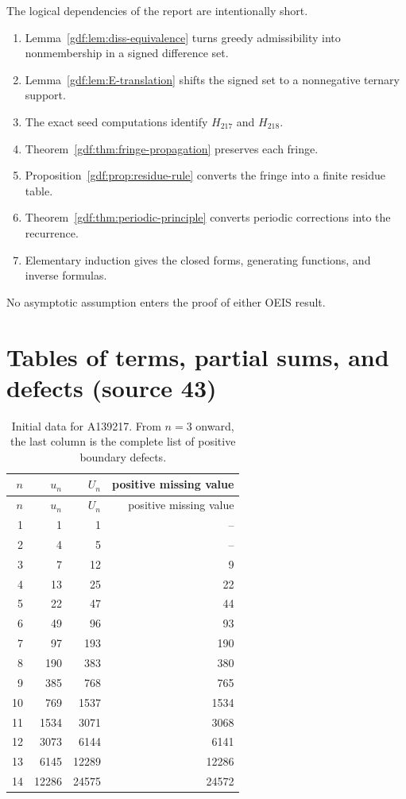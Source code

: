 \documentclass[11pt,a4paper]{article}
\numberwithin{equation}{section}
\theoremstyle{definition}
\theoremstyle{remark}
\theoremstyle{plain}
\newcommand{\src}[1]{\textup{(source #1)}}
\begin{document}
The logical dependencies of the report are intentionally short.
\begin{enumerate}[label=(\arabic*)]
\item Lemma~\ref{gdf:lem:diss-equivalence} turns greedy admissibility into
      nonmembership in a signed difference set.
\item Lemma~\ref{gdf:lem:E-translation} shifts the signed set to a nonnegative
      ternary support.
\item The exact seed computations identify $H_{217}$ and $H_{218}$.
\item Theorem~\ref{gdf:thm:fringe-propagation} preserves each fringe.
\item Proposition~\ref{gdf:prop:residue-rule} converts the fringe into a finite
      residue table.
\item Theorem~\ref{gdf:thm:periodic-principle} converts periodic corrections into
      the recurrence.
\item Elementary induction gives the closed forms, generating functions, and
      inverse formulas.
\end{enumerate}
No asymptotic assumption enters the proof of either OEIS result.

\section{Tables of terms, partial sums, and defects \src{43}}\label{gdf:app:tables}

\begin{longtable}{r r r r}
\caption{Initial data for A139217.  From $n=3$ onward, the last column is the complete list of positive boundary defects.}\label{gdf:tab:data-u}\\
\toprule
$n$&$u_n$&$U_n$&positive missing value\\
\midrule
\endfirsthead
\toprule
$n$&$u_n$&$U_n$&positive missing value\\
\midrule
\endhead
1&1&1&--\\
2&4&5&--\\
3&7&12&9\\
4&13&25&22\\
5&22&47&44\\
6&49&96&93\\
7&97&193&190\\
8&190&383&380\\
9&385&768&765\\
10&769&1537&1534\\
11&1534&3071&3068\\
12&3073&6144&6141\\
13&6145&12289&12286\\
14&12286&24575&24572\\
\bottomrule
\end{longtable}
\end{document}
